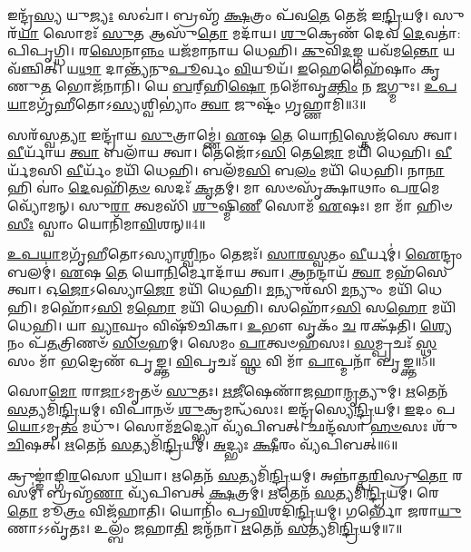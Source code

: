𑌇𑌨𑍍𑌦𑍍𑌰᳴\-\ul{𑌸𑍍𑌯} 𑌯𑍁\-\ul{𑌜𑍍𑌯𑌃} 𑌸𑌖𑌾॑।
𑌬𑍍𑌰𑌹𑍍𑌮᳴ \ul{𑌕𑍍𑌷}\-𑌤𑍍𑌰𑌂 𑌪᳴𑌵\-\ul{𑌤𑍇} 𑌤𑍇𑌜᳴ 𑌇\-\ul{𑌨𑍍𑌦𑍍𑌰𑌿}\-𑌯𑌮𑍍।
𑌸𑍁𑌰᳴\-\ul{𑌯𑌾} 𑌸𑍋𑌮𑌃᳴ \ul{𑌸𑍁}\-𑌤 𑌆𑌸𑍁᳴\-\ul{𑌤𑍋} 𑌮𑌦𑌾᳴𑌯।
\-\ul{𑌶𑍁}\-𑌕𑍍𑌰𑍇𑌣᳴ 𑌦𑍇𑌵 \ul{𑌦𑍇}\-𑌵𑌤𑌾॑: 𑌪𑌿𑌪𑍃𑌗𑍍𑌧𑌿।
𑌰\-\ul{𑌸𑍇}\-𑌨𑌾\-\ul{𑌨𑍍𑌨𑌂} 𑌯𑌜᳴𑌮𑌾𑌨𑌾𑌯 𑌧𑍇𑌹𑌿।
\-\ul{𑌕𑍁}\-𑌵𑌿\-\ul{𑌦}\-𑌙𑍍𑌗 𑌯𑌵᳴𑌮\-\ul{𑌨𑍍𑌤𑍋} 𑌯𑌵᳴𑌞𑍍𑌚𑌿𑌤𑍍।
𑌯\-\ul{𑌥𑌾} 𑌦𑌾𑌨𑍍𑌤𑍍𑌯᳴𑌨𑍁\-\ul{𑌪𑍂}\-𑌰𑍍𑌵𑌂 \ul{𑌵𑌿}\-𑌯𑍂𑌯᳴।
\-\ul{𑌇}\-𑌹𑍇𑌹𑍈᳴𑌷𑌾𑌂 𑌕𑍃𑌣𑍁\-\ul{𑌤} 𑌭𑍋𑌜᳴𑌨𑌾𑌨𑌿।
𑌯𑍇 \ul{𑌬}\-𑌰𑍍‌॒\mbox{}𑌹𑌿\-\ul{𑌷𑍋} 𑌨𑌮𑍋᳴𑌵𑍃\-\ul{𑌕𑍍𑌤𑌿𑌂} 𑌨 \ul{𑌜}\-𑌗𑍍𑌮𑍁𑌃।
\-\ul{𑌉}\-\-\ul{𑌪}\-\-\ul{𑌯𑌾}\-𑌮𑌗𑍃᳴𑌹𑍀𑌤𑍋\-𑌽\-\ul{𑌸𑍍𑌯}\-𑌶𑍍𑌵𑌿𑌭𑍍𑌯𑌾𑌂॑ \ul{𑌤𑍍𑌵𑌾} 𑌜𑍁𑌷𑍍𑌟𑌂᳴ 𑌗𑍃𑌹𑍍𑌣𑌾𑌮𑌿॥3॥

𑌸𑌰᳴𑌸𑍍𑌵\-\ul{𑌤𑍍𑌯𑌾} 𑌇𑌨𑍍𑌦𑍍𑌰𑌾᳴𑌯 \ul{𑌸𑍁}\-𑌤𑍍𑌰𑌾𑌮𑍍𑌣𑍇॑।
\-\ul{𑌏}\-𑌷 \ul{𑌤𑍇} 𑌯𑍋\-\ul{𑌨𑌿}\-𑌸𑍍𑌤𑍇𑌜᳴𑌸𑍇 𑌤𑍍𑌵𑌾।
\-\ul{𑌵𑍀}\-𑌰𑍍𑌯𑌾᳴𑌯 \ul{𑌤𑍍𑌵𑌾} 𑌬𑌲𑌾᳴𑌯 𑌤𑍍𑌵𑌾।
𑌤𑍇𑌜𑍋᳴𑌽\-\ul{𑌸𑌿} 𑌤𑍇\-\ul{𑌜𑍋} 𑌮𑌯𑌿᳴ 𑌧𑍇𑌹𑌿।
\-\ul{𑌵𑍀}\-𑌰𑍍𑌯᳴𑌮𑌸𑌿 \ul{𑌵𑍀}\-𑌰𑍍𑌯𑌂᳴ 𑌮𑌯𑌿᳴ 𑌧𑍇𑌹𑌿।
𑌬𑌲᳴𑌮\-\ul{𑌸𑌿} 𑌬\-\ul{𑌲𑌂} 𑌮𑌯𑌿᳴ 𑌧𑍇𑌹𑌿।
𑌨𑌾\-\ul{𑌨𑌾} 𑌹𑌿 𑌵𑌾𑌂॑ \ul{𑌦𑍇}\-𑌵𑌹𑌿᳴\-\ul{𑌤}\-\-\ul{𑍞} 𑌸𑌦𑌃᳴ \ul{𑌕𑍃}\-𑌤𑌮𑍍।
𑌮𑌾 𑌸𑍞𑌸𑍃᳴𑌕𑍍𑌷𑌾𑌥𑌾𑌂 𑌪\-\ul{𑌰}\-𑌮𑍇 𑌵𑍍𑌯𑍋᳴𑌮𑌨𑍍।
𑌸𑍁\-\ul{𑌰𑌾} 𑌤𑍍𑌵𑌮𑌸𑌿᳴ \ul{𑌶𑍁}\-𑌷𑍍𑌮𑌿\-\ul{𑌣𑍀} 𑌸𑍋𑌮᳴ \ul{𑌏}\-𑌷𑌃।
𑌮𑌾 𑌮𑌾᳴ 𑌹𑌿𑍞\-\ul{𑌸𑍀𑌃} 𑌸𑍍𑌵𑌾𑌂 𑌯𑍋𑌨𑌿᳴𑌮𑌾\-\ul{𑌵𑌿}\-𑌶𑌨𑍍॥4॥

\-\ul{𑌉}\-\-\ul{𑌪}\-\-\ul{𑌯𑌾}\-𑌮𑌗𑍃᳴𑌹𑍀𑌤𑍋\-𑌽𑌸𑍍𑌯𑌾\-\ul{𑌶𑍍𑌵𑌿}\-𑌨𑌂 𑌤𑍇𑌜𑌃᳴।
\-\ul{𑌸𑌾}\-\-\ul{𑌰}\-\-\ul{𑌸𑍍𑌵}\-𑌤𑌂 \ul{𑌵𑍀}\-𑌰𑍍𑌯𑌮𑍍॑।
\-\ul{𑌐}\-𑌨𑍍𑌦𑍍𑌰𑌂 𑌬𑌲𑌮𑍍॑।
\-\ul{𑌏}\-𑌷 \ul{𑌤𑍇} 𑌯𑍋\-\ul{𑌨𑌿}\-𑌰𑍍𑌮𑍋𑌦𑌾᳴𑌯 𑌤𑍍𑌵𑌾।
\-\ul{𑌆}\-\-\ul{𑌨}\-𑌨𑍍𑌦𑌾𑌯᳴ \ul{𑌤𑍍𑌵𑌾} 𑌮𑌹᳴𑌸𑍇 𑌤𑍍𑌵𑌾।
𑌓\-\ul{𑌜𑍋}\-𑌽𑌸𑍍𑌯𑍋\-\ul{𑌜𑍋} 𑌮𑌯𑌿᳴ 𑌧𑍇𑌹𑌿।
\-\ul{𑌮}\-𑌨𑍍𑌯𑍁𑌰᳴𑌸𑌿 \ul{𑌮}\-𑌨𑍍𑌯𑍁𑌂 𑌮𑌯𑌿᳴ 𑌧𑍇𑌹𑌿।
𑌮𑌹𑍋᳴𑌽\-\ul{𑌸𑌿} 𑌮\-\ul{𑌹𑍋} 𑌮𑌯𑌿᳴ 𑌧𑍇𑌹𑌿।
𑌸𑌹𑍋᳴𑌽\-\ul{𑌸𑌿} 𑌸\-\ul{𑌹𑍋} 𑌮𑌯𑌿᳴ 𑌧𑍇𑌹𑌿।
𑌯𑌾 \ul{𑌵𑍍𑌯𑌾}\-𑌘𑍍𑌰𑌂 𑌵𑌿𑌷𑍂᳴𑌚𑌿𑌕𑌾।
\-\ul{𑌉}\-𑌭𑍗 𑌵𑍃𑌕𑌂᳴ \ul{𑌚} 𑌰𑌕𑍍𑌷᳴𑌤𑌿।
\-\ul{𑌶𑍍𑌯𑍇}\-𑌨𑌂 𑌪᳴\-\ul{𑌤}\-𑌤𑍍𑌰𑌿𑌣𑍞᳴ \ul{𑌸𑌿}\-\-\ul{𑍞}\-𑌹𑌮𑍍।
𑌸𑍇𑌮𑌂 \ul{𑌪𑌾}\-𑌤𑍍𑌵𑍞𑌹᳴𑌸𑌃।
\-\ul{𑌸}\-𑌮𑍍𑌪𑍃𑌚𑌃᳴ \ul{𑌸𑍍𑌥} 𑌸𑌂 𑌮𑌾᳴ \ul{𑌭}\-𑌦𑍍𑌰𑍇𑌣᳴ 𑌪𑍃𑌙𑍍𑌕𑍍𑌤।
\-\ul{𑌵𑌿}\-𑌪𑍃𑌚𑌃᳴ \ul{𑌸𑍍𑌥} 𑌵𑌿 𑌮𑌾᳴ \ul{𑌪𑌾}\-𑌪𑍍𑌮𑌨𑌾᳴ 𑌪𑍃𑌙𑍍𑌕𑍍𑌤॥5॥\anuvakamend[\-\ul{𑌹}\-𑌵𑌿𑌃 \ul{𑌪𑍍𑌰}\-𑌤𑍍𑌯𑌙𑍍𑌖𑍍𑌸𑍋\-\ul{𑌮𑍋} 𑌅𑌤𑌿᳴𑌦𑍍𑌰𑍁𑌤𑍋 𑌗𑍃𑌹𑍍𑌣𑌾𑌮𑍍𑌯𑌾\-\ul{𑌵𑌿}\-𑌶𑌨𑍍𑌵𑌿𑌷𑍂᳴𑌚𑌿\-\ul{𑌕𑌾} 𑌪𑌞𑍍𑌚᳴ 𑌚]

𑌸𑍋\-\ul{𑌮𑍋} 𑌰𑌾\-\ul{𑌜𑌾}\-\-𑌽𑌮𑍃𑌤𑍞᳴ \ul{𑌸𑍁}\-𑌤𑌃।
\-\ul{𑌋}\-\-\ul{𑌜𑍀}\-𑌷𑍇𑌣𑌾᳴𑌜𑌹𑌾\-\ul{𑌨𑍍𑌮𑍃}\-𑌤𑍍𑌯𑍁𑌮𑍍।
\-\ul{𑌋}\-𑌤𑍇𑌨᳴ \ul{𑌸}\-𑌤𑍍𑌯𑌮𑌿᳴\-\ul{𑌨𑍍𑌦𑍍𑌰𑌿}\-𑌯𑌮𑍍।
𑌵𑌿𑌪𑌾𑌨𑍞᳴ \ul{𑌶𑍁}\-𑌕𑍍𑌰𑌮𑌨𑍍𑌧᳴𑌸𑌃।
𑌇𑌨𑍍𑌦𑍍𑌰᳴𑌸𑍍𑌯𑍇\-\ul{𑌨𑍍𑌦𑍍𑌰𑌿}\-𑌯𑌮𑍍।
\-\ul{𑌇}\-𑌦𑌂 𑌪\-\ul{𑌯𑍋}\-\-𑌽𑌮𑍃\-\ul{𑌤𑌂} 𑌮𑌧𑍁᳴।
𑌸𑍋𑌮᳴\-\ul{𑌮}\-𑌦𑍍𑌭𑍍𑌯𑍋 𑌵𑍍𑌯᳴𑌪𑌿𑌬𑌤𑍍।
𑌛𑌨𑍍𑌦᳴𑌸𑌾 \ul{𑌹}\-\-\ul{𑍞}\-𑌸𑌃 𑌶𑍁᳴\-\ul{𑌚𑌿}\-𑌷𑌤𑍍।
\-\ul{𑌋}\-𑌤𑍇𑌨᳴ \ul{𑌸}\-𑌤𑍍𑌯𑌮𑌿᳴\-\ul{𑌨𑍍𑌦𑍍𑌰𑌿}\-𑌯𑌮𑍍।
\-\ul{𑌅}\-𑌦𑍍𑌭𑍍𑌯𑌃 \ul{𑌕𑍍𑌷𑍀}\-𑌰𑌂 𑌵𑍍𑌯᳴𑌪𑌿𑌬𑌤𑍍॥6॥

𑌕𑍍𑌰𑍁𑌙𑍍𑌙𑌾॑𑌙𑍍𑌗𑌿\-\ul{𑌰}\-𑌸𑍋 \ul{𑌧𑌿}\-𑌯𑌾।
\-\ul{𑌋}\-𑌤𑍇𑌨᳴ \ul{𑌸}\-𑌤𑍍𑌯𑌮𑌿᳴\-\ul{𑌨𑍍𑌦𑍍𑌰𑌿}\-𑌯𑌮𑍍।
𑌅𑌨𑍍𑌨𑌾॑𑌤𑍍𑌪\-\ul{𑌰𑌿}\-𑌸𑍍𑌰𑍁\-\ul{𑌤𑍋} 𑌰𑌸𑌮𑍍॑।
𑌬𑍍𑌰𑌹𑍍𑌮᳴\-\ul{𑌣𑌾} 𑌵𑍍𑌯᳴𑌪𑌿𑌬𑌤𑍍 \ul{𑌕𑍍𑌷}\-𑌤𑍍𑌰𑌮𑍍।
\-\ul{𑌋}\-𑌤𑍇𑌨᳴ \ul{𑌸}\-𑌤𑍍𑌯𑌮𑌿᳴\-\ul{𑌨𑍍𑌦𑍍𑌰𑌿}\-𑌯𑌮𑍍।
𑌰𑍇\-\ul{𑌤𑍋} 𑌮𑍂\-\ul{𑌤𑍍𑌰𑌂} 𑌵𑌿𑌜᳴𑌹𑌾𑌤𑌿।
𑌯𑍋𑌨𑌿𑌂᳴ 𑌪𑍍𑌰\-\ul{𑌵𑌿}\-𑌶𑌦𑌿᳴\-\ul{𑌨𑍍𑌦𑍍𑌰𑌿}\-𑌯𑌮𑍍।
𑌗𑌰𑍍𑌭𑍋᳴ \ul{𑌜}\-𑌰𑌾\-\ul{𑌯𑍁}\-𑌣𑌾\-𑌽𑌽𑌵𑍃᳴𑌤𑌃।
𑌉𑌲𑍍𑌬𑌂᳴ 𑌜𑌹𑌾\-\ul{𑌤𑌿} 𑌜𑌨𑍍𑌮᳴𑌨𑌾।
\-\ul{𑌋}\-𑌤𑍇𑌨᳴ \ul{𑌸}\-𑌤𑍍𑌯𑌮𑌿᳴\-\ul{𑌨𑍍𑌦𑍍𑌰𑌿}\-𑌯𑌮𑍍॥7॥

